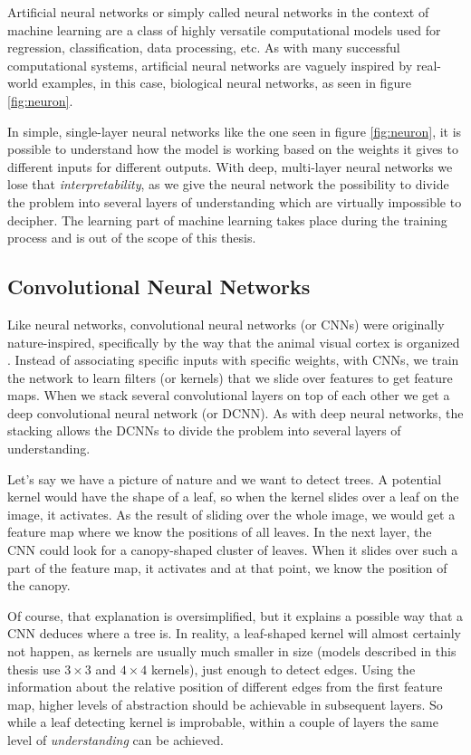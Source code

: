 Artificial neural networks or simply called neural networks in the context of 
machine learning are a class of highly versatile computational models used for 
regression, classification, data processing, etc. As with many successful computational 
systems, artificial neural networks are vaguely inspired by real-world examples,
in this case, biological neural networks, as seen in figure \ref{fig:neuron}. 

In simple, single-layer neural networks like the one seen in figure \ref{fig:neuron}, 
it is possible to understand how the model is working based on the weights it gives
to different inputs for different outputs. With deep, multi-layer neural networks 
we lose that \textit{interpretability}, as we give the neural network the possibility
to divide the problem into several layers of understanding which are virtually 
impossible to decipher. The learning part of machine learning takes place during the
training process and is out of the scope of this thesis.

\subsection{Convolutional Neural Networks}
\label{sec:cnn}

Like neural networks, convolutional neural networks (or CNNs) were originally 
nature-inspired, specifically by the way that the animal visual cortex is 
organized \citep{fukushima1980neocognitron}. Instead of associating specific
inputs with specific weights, with CNNs, we train the network to learn filters 
(or kernels) that we slide over features to get feature maps. When we stack
several convolutional layers on top of each other we get a deep convolutional
neural network (or DCNN). As with deep neural networks, the stacking allows 
the DCNNs to divide the problem into several layers of understanding. 

Let's say we have a picture of nature and we want to detect trees. A potential 
kernel would have the shape of a leaf, so when the kernel slides over a leaf on
the image, it activates. As the result of sliding over the whole image, we would
get a feature map where we know the positions of all leaves. In the next layer, 
the CNN could look for a canopy-shaped cluster of leaves. When it slides
over such a part of the feature map, it activates and at that point, we know the position
of the canopy.

Of course, that explanation is oversimplified, but it explains a possible way 
that a CNN deduces where a tree is. In reality, a leaf-shaped kernel will almost
certainly not happen, as kernels are usually much smaller in size (models
described in this thesis use $3\times3$ and $4\times4$ kernels), just enough to 
detect edges. Using the information about the relative position of different edges
from the first feature map, higher levels of abstraction should be achievable in 
subsequent layers. So while a leaf detecting kernel is improbable, within a couple
of layers the same level of \textit{understanding} can be achieved.

